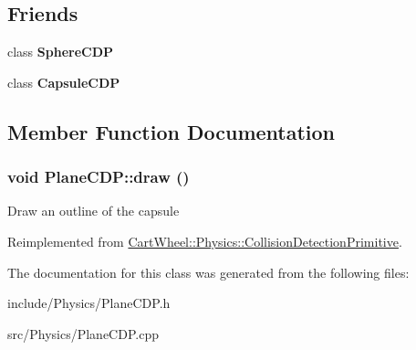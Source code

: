 \subsection*{Friends}
\begin{DoxyCompactItemize}
\item 
\hypertarget{classCartWheel_1_1Physics_1_1PlaneCDP_a67bc19fca1dc4df1cab00735e1b322cb}{
class {\bfseries SphereCDP}}
\label{classCartWheel_1_1Physics_1_1PlaneCDP_a67bc19fca1dc4df1cab00735e1b322cb}

\item 
\hypertarget{classCartWheel_1_1Physics_1_1PlaneCDP_a0cfe4866e6a497493ff1c814aebd1ba5}{
class {\bfseries CapsuleCDP}}
\label{classCartWheel_1_1Physics_1_1PlaneCDP_a0cfe4866e6a497493ff1c814aebd1ba5}

\end{DoxyCompactItemize}


\subsection{Member Function Documentation}
\hypertarget{classCartWheel_1_1Physics_1_1PlaneCDP_af05d808b4b8c86c3737bbe05ee624cd9}{
\subsubsection[{draw}]{\setlength{\rightskip}{0pt plus 5cm}void PlaneCDP::draw ()}}
\label{classCartWheel_1_1Physics_1_1PlaneCDP_af05d808b4b8c86c3737bbe05ee624cd9}
Draw an outline of the capsule 

Reimplemented from \hyperlink{classCartWheel_1_1Physics_1_1CollisionDetectionPrimitive_a26c85561d35a7df8bb48697da9c1cb10}{CartWheel::Physics::CollisionDetectionPrimitive}.



The documentation for this class was generated from the following files:\begin{DoxyCompactItemize}
\item 
include/Physics/PlaneCDP.h\item 
src/Physics/PlaneCDP.cpp\end{DoxyCompactItemize}
